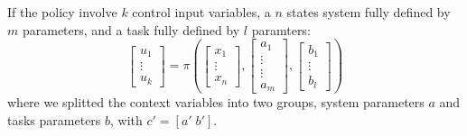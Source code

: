 If the policy involve $k$ control input variables, a $n$ states system fully defined by $m$ parameters, and a task fully defined by $l$ paramters:
\begin{equation}
\begin{bmatrix}
u_1 \\
\vdots \\
u_k
\end{bmatrix}
=
\pi \left(
\begin{bmatrix}
x_1 \\
\vdots \\
x_n
\end{bmatrix}
,
\begin{bmatrix}
a_1 \\
\vdots \\
\vdots \\
a_m
\end{bmatrix}
,
\begin{bmatrix}
b_1 \\
\vdots \\
b_l
\end{bmatrix}
\right) 
\end{equation}
where we splitted the context variables into two groups, system parameters $a$ and tasks parameters $b$, with $c'= [a' \; b'] $.

